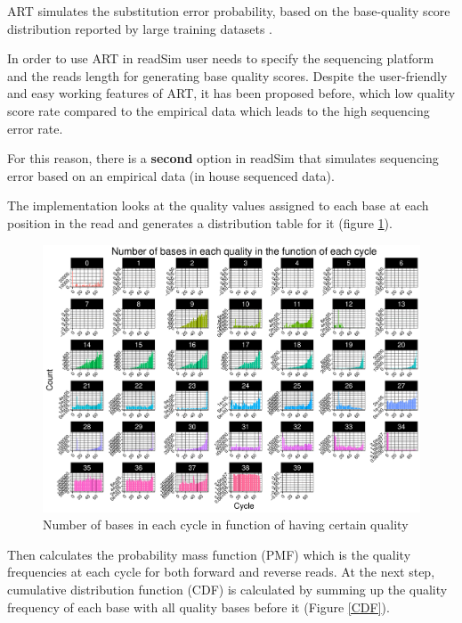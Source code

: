 \documentclass[11pt,a4paper]{report}
\begin{document}
ART simulates the substitution error probability, based on the base-quality 
score distribution reported by large training datasets \cite{art}.

In order to use ART in readSim user needs to specify the sequencing platform 
and the reads length for generating base quality scores. Despite the user-friendly 
and easy working features of ART, it has been proposed before, which low quality score 
rate compared to the empirical data\cite{pssm} which leads to the high sequencing
error rate.

For this reason, there is a \textbf{second} option in readSim that simulates
sequencing error based on an empirical data (in house sequenced data).

The implementation looks at the quality values assigned to each base at each
position in the read and generates a distribution table for it (figure \ref{hist}).

\begin{figure}[H]
\centering
\includegraphics[width=12cm]{pictures/Rplot_quality.pdf}
\caption{Number of bases in each cycle in function of having certain quality}
\label{hist}
\end{figure}

Then calculates the probability mass function (PMF) which is the quality 
frequencies at each cycle for both forward and reverse reads. At the next 
step, cumulative distribution function (CDF) is calculated by summing up the 
quality frequency of each base with all quality bases before it (Figure \ref{CDF}).
\end{document}
